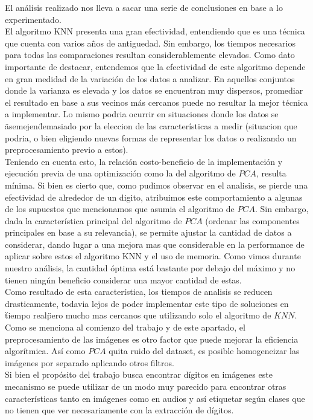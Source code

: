 El análisis realizado nos lleva a sacar una serie de conclusiones en base a lo experimentado.
\\
El algoritmo KNN presenta una gran efectividad, entendiendo que es una técnica que cuenta con varios años de antiguedad. Sin embargo, los tiempos necesarios para todas las comparaciones resultan considerablemente elevados.
Como dato importante de destacar, entendemos que la efectividad de este algoritmo depende en gran medidad de la variación de los datos a analizar. En aquellos conjuntos donde la varianza es elevada y los datos se encuentran muy dispersos, promediar el resultado en base a sus vecinos más cercanos puede no resultar la mejor técnica a implementar. Lo mismo podria ocurrir en situaciones donde los datos se \"asemejen\" demasiado por la eleccion de las características a medir (situacion que podria, o bien eligiendo nuevas formas de representar los datos o realizando un preprocesamiento previo a estos).
\\
Teniendo en cuenta esto, la relación costo-beneficio de la implementación y ejecución previa de una optimización como la del algoritmo de $PCA$, resulta mínima. Si bien es cierto que, como pudimos observar en el analisis, se pierde una efectividad de alrededor de un digito, atribuimos este comportamiento a algunas de los supuestos que mencionamos que asumia el algoritmo de $PCA$.
Sin embargo, dada la característica principal del algoritmo de $PCA$ (ordenar las componentes principales en base a su relevancia), se permite ajustar la cantidad de datos a considerar, dando lugar a una mejora mas que considerable en la performance de aplicar sobre estos el algoritmo KNN y el uso de memoria. Como vimos durante nuestro análisis, la cantidad óptima está bastante por debajo del máximo y no tienen ningún beneficio considerar una mayor cantidad de estas.
\\
Como resultado de esta característica, los tiempos de analisis se reducen drasticamente, todavia lejos de poder implementar este tipo de soluciones en \"tiempo real\" pero mucho mas cercanos que utilizando solo el algoritmo de $KNN$.
\\
Como se menciona al comienzo del trabajo y de este apartado, el preprocesamiento de las imágenes es otro factor que puede mejorar la eficiencia algorítmica. Así como $PCA$ quita ruido del dataset, es posible homogeneizar las imágenes por separado aplicando otros filtros.
\\
Si bien el propósito del trabajo busca encontrar dígitos en imágenes este mecanismo se puede utilizar de un modo muy parecido para encontrar otras características tanto en imágenes como en audios y así etiquetar según clases que no tienen que ver necesariamente con la extracción de dígitos. 
